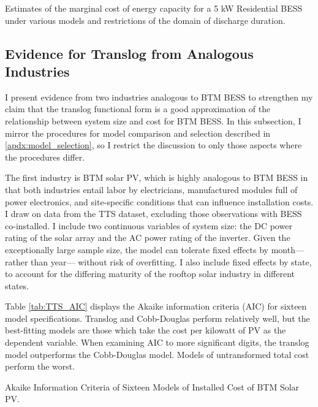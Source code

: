 \begin{landscape}
\begin{table}[h]
\centering

\caption{Estimates of the marginal cost of energy capacity for a 5 kW Residential BESS under various models and restrictions of the domain of discharge duration.}\label{tab:MC_estimates}
\end{table}
\end{landscape}

\subsection{Evidence for Translog from Analogous Industries}\label{apdx:analog_AIC}

I present evidence from two industries analogous to BTM BESS to strengthen my claim that the translog functional form is a good approximation of the relationship between system size and cost for BTM BESS. In this subsection, I mirror the procedures for model comparison and selection described in \ref{apdx:model_selection}, so I restrict the discussion to only those aspects where the procedures differ.

The first industry is BTM solar PV, which is highly analogous to BTM BESS in that both industries entail labor by electricians, manufactured modules full of power electronics, and site-specific conditions that can influence installation costs. I draw on data from the TTS dataset, excluding those observations with BESS co-installed. I include two continuous variables of system size: the DC power rating of the solar array and the AC power rating of the inverter. Given the exceptionally large sample size, the model can tolerate fixed effects by month---rather than year--- without risk of overfitting. I also include fixed effects by state, to account for the differing maturity of the rooftop solar industry in different states.

Table \ref{tab:TTS_AIC} displays the Akaike information criteria (AIC) for sixteen model specifications. Translog and Cobb-Douglas perform relatively well, but the best-fitting models are those which take the cost per kilowatt of PV as the dependent variable. When examining AIC to more significant digits, the translog model outperforms the Cobb-Douglas model. Models of untransformed total cost perform the worst.

\begin{table}[t]
\centering

\caption{Akaike Information Criteria of Sixteen Models of Installed Cost of BTM Solar PV.}\label{tab:TTS_AIC}
\end{table}


